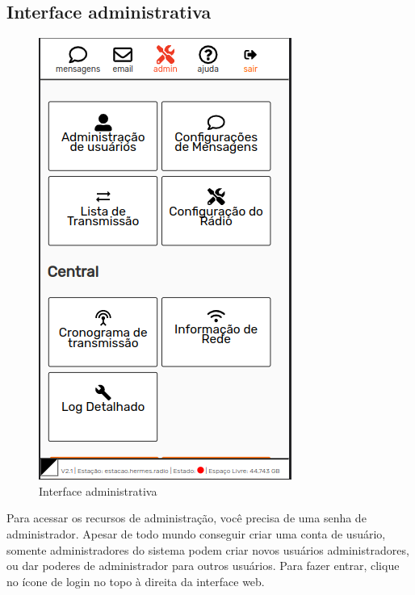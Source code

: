 \documentclass[11pt,a4paper]{article}
\begin{document}


\subsection{Interface administrativa}
\label{admininterface}

\begin{figure}[H]
    \centering
    \includegraphics[width=0.5\columnwidth]{screenshots/frontend/pt_kn/admin.png}
    \caption{Interface administrativa}
    \label{fig:admin}
\end{figure}

Para acessar os recursos de administração, você precisa de uma senha de administrador. Apesar de todo mundo conseguir criar uma conta de usuário, somente administradores do sistema podem criar novos usuários administradores, ou dar poderes de administrador para outros usuários. Para fazer entrar, clique no ícone de login no topo à direita da interface web.
\end{document}
